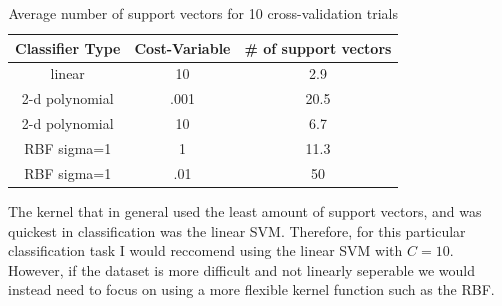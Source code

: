\documentclass[paper=a4, fontsize=11pt]{scrartcl} %
\begin{document}
\begin{table}
\centering
\label{tab:nsv}
\caption{Average number of support vectors for 10 cross-validation trials}
\begin{tabular}{|c|c|c|}
\hline
Classifier Type & Cost-Variable & \# of support vectors \\ \hline \hline
linear & 10 & 2.9 \\ \hline
2-d polynomial & .001 & 20.5 \\ \hline
2-d polynomial & 10 & 6.7 \\ \hline
RBF sigma=1 & 1 & 11.3 \\ \hline
RBF sigma=1 & .01 & 50 \\ \hline
\end{tabular}
\end{table}

The kernel that in general used the least amount of support vectors, and was quickest in classification was the linear SVM.
Therefore, for this particular classification task I would reccomend using the linear SVM with $C=10$.
However, if the dataset is more difficult and not linearly seperable we would instead need to focus on using a more flexible kernel function such as the RBF.  
\end{document}
